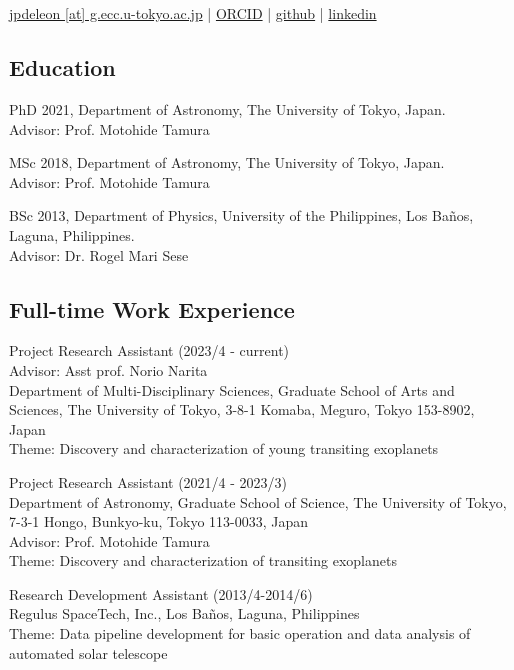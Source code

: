 \documentclass[12pt,letterpaper]{article}
\begin{document}
\thispagestyle{empty}\sloppy\sloppypar\raggedbottom

\textbf{\Large \fullname} \\[0.5ex]
\currentposition \\
\textsf{\small 
    \href{mailto:\email}{jpdeleon [at] g.ecc.u-tokyo.ac.jp} | %
    \href{\orcidurl}{ORCID} | %
    \href{\githuburl}{github} | %
    \href{\linkedinurl}{linkedin}
}\\[0.5ex]

\subsection{Education}
\begin{list}{}{\cvlist}
  \item
        PhD 2021, Department of Astronomy, The University of Tokyo, Japan.\\Advisor: Prof. Motohide Tamura
  \item
        MSc 2018, Department of Astronomy, The University of Tokyo, Japan.\\Advisor: Prof. Motohide Tamura
  \item
        BSc 2013, Department of Physics, University of the Philippines, Los Ba\~nos, Laguna, Philippines.\\Advisor: Dr. Rogel Mari Sese      
\end{list}

\subsection{Full-time Work Experience}
\begin{list}{}{\cvlist}
  \item
      Project Research Assistant (2023/4 - current) \\
      Advisor: Asst prof. Norio Narita \\
      Department of Multi-Disciplinary Sciences, Graduate School of Arts and Sciences, The University of Tokyo, 3-8-1 Komaba, Meguro, Tokyo 153-8902, Japan \\
      Theme: Discovery and characterization of young transiting exoplanets \\
  \item
      Project Research Assistant (2021/4 - 2023/3) \\
      Department of Astronomy, Graduate School of Science, The University of Tokyo, 7-3-1 Hongo, Bunkyo-ku, Tokyo 113-0033, Japan \\
      Advisor: Prof. Motohide Tamura \\
      Theme: Discovery and characterization of transiting exoplanets \\
  \item Research Development Assistant (2013/4-2014/6)\\
      Regulus SpaceTech, Inc., Los Ba\~nos, Laguna, Philippines\\
      Theme: Data pipeline development for basic operation and data analysis of automated solar telescope
\end{list}
\end{document}
